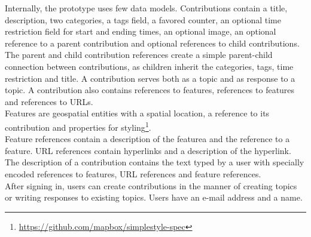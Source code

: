 \documentclass{sigchi}
\begin{document}
Internally, the prototype uses few data models. Contributions contain a title, description, two categories, a tags field, a favored counter, an optional time restriction field for start and ending times, an optional image, an optional reference to a parent contribution and optional references to child contributions. The parent and child contribution references create a simple parent-child connection between contributions, as children inherit the categories, tags, time restriction and title. A contribution serves both as a topic and as response to a topic. A contribution also contains references to features, references to features and references to URLs.\\
Features are geospatial entities with a spatial location, a reference to its contribution and properties for styling\footnote{\url{https://github.com/mapbox/simplestyle-spec}}.\\
Feature references contain a description of the featurea and the reference to a feature. URL references contain hyperlinks and a description of the hyperlink. The description of a contribution contains the text typed by a user with specially encoded references to features, URL references and feature references.\\
After signing in, users can create contributions in the manner of creating topics or writing responses to existing topics. Users have an e-mail address and a name.
\end{document}
